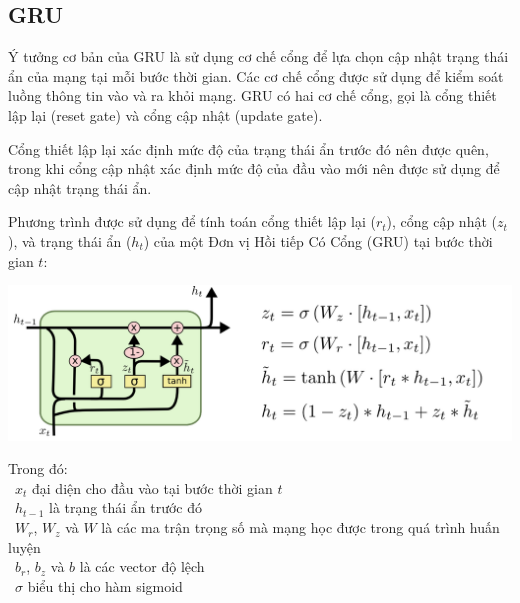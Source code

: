 \subsection{GRU}
Ý tưởng cơ bản của GRU là sử dụng cơ chế cổng để lựa chọn cập nhật trạng thái ẩn của mạng tại mỗi bước thời gian. Các cơ chế cổng được sử dụng để kiểm soát luồng thông tin vào và ra khỏi mạng. GRU có hai cơ chế cổng, gọi là cổng thiết lập lại (reset gate) và cổng cập nhật (update gate).
\par
Cổng thiết lập lại xác định mức độ của trạng thái ẩn trước đó nên được quên, trong khi cổng cập nhật xác định mức độ của đầu vào mới nên được sử dụng để cập nhật trạng thái ẩn.
\par
Phương trình được sử dụng để tính toán cổng thiết lập lại (\(r_t\)), cổng cập nhật (\(z_t\)), và trạng thái ẩn (\(h_t\)) của một Đơn vị Hồi tiếp Có Cổng (GRU) tại bước thời gian \(t\):

\begin{minipage}{0.5\textwidth}
\centering
\includegraphics[width=1\textwidth]{resources/chapter-4/gru-1.png}
\end{minipage}

Trong đó:\\
    \indent\textbullet\ \(x_t\) đại diện cho đầu vào tại bước thời gian \(t\)\\
    \indent\textbullet\ \(h_{t-1}\)  là trạng thái ẩn trước đó \\
    \indent\textbullet\ \(W_r\), \(W_z\) và \(W\) là các ma trận trọng số mà mạng học được trong quá trình huấn luyện\\
    \indent\textbullet\ \(b_r\), \(b_z\) và \(b\) là các vector độ lệch\\
    \indent\textbullet\ \(\sigma\) biểu thị cho hàm sigmoid
    
